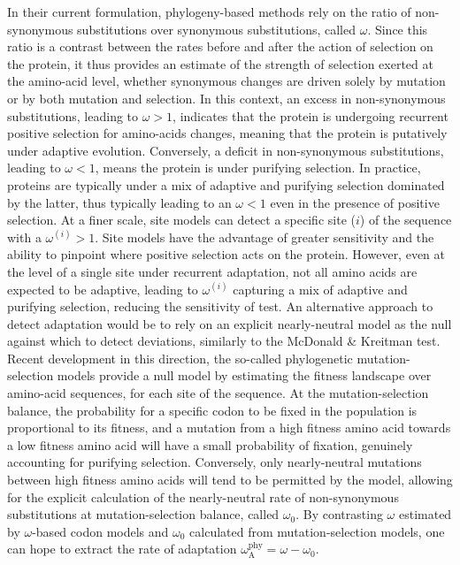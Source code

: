 \documentclass[9pt,twocolumn,twoside,lineno]{pnas-new}
\newcommand{\rateApop}{\omega_{\mathrm{A}}}
\newcommand{\rateAphy}{\rateApop^{\mathrm{phy}}}
\begin{document}
In their current formulation, phylogeny-based methods rely on the ratio of non-synonymous substitutions over synonymous substitutions, called $\omega$\cite{muse_likelihood_1994,goldman_codonbased_1994}.
Since this ratio is a contrast between the rates before and after the action of selection on the protein, it thus provides an estimate of the strength of selection exerted at the amino-acid level, whether synonymous changes are driven solely by mutation or by both mutation and selection\cite{yang_mutationselection_2008}.
In this context, an excess in non-synonymous substitutions, leading to $\omega>1$, indicates that the protein is undergoing recurrent positive selection for amino-acids changes, meaning that the protein is putatively under adaptive evolution.
Conversely, a deficit in non-synonymous substitutions, leading to $\omega<1$, means the protein is under purifying selection.
In practice, proteins are typically under a mix of adaptive and purifying selection dominated by the latter, thus typically leading to an $\omega<1$ even in the presence of positive selection.
At a finer scale, site models can detect a specific site ($i$) of the sequence with a $\omega^{(i)}>1$\cite{yang_codonsubstitution_2000, kosiol_patterns_2008}.
Site models have the advantage of greater sensitivity and the ability to pinpoint where positive selection acts on the protein.
However, even at the level of a single site under recurrent adaptation, not all amino acids are expected to be adaptive, leading to $\omega^{(i)}$ capturing a mix of adaptive and purifying selection, reducing the sensitivity of test.
An alternative approach to detect adaptation would be to rely on an explicit nearly-neutral model as the null against which to detect deviations, similarly to the McDonald \& Kreitman test.
Recent development in this direction, the so-called phylogenetic mutation-selection models provide a null model by estimating the fitness landscape over amino-acid sequences, for each site of the sequence\cite{yang_mutationselection_2008, halpern_evolutionary_1998, rodrigue_mechanistic_2010}.
At the mutation-selection balance, the probability for a specific codon to be fixed in the population is proportional to its fitness, and a mutation from a high fitness amino acid towards a low fitness amino acid will have a small probability of fixation, genuinely accounting for purifying selection.
Conversely, only nearly-neutral mutations between high fitness amino acids will tend to be permitted by the model, allowing for the explicit calculation of the nearly-neutral rate of non-synonymous substitutions at mutation-selection balance, called $\omega_{0}$\cite{spielman_relationship_2015, rodrigue_detecting_2017}.
By contrasting $\omega$ estimated by $\omega$-based codon models and $\omega_{0}$ calculated from mutation-selection models, one can hope to extract the rate of adaptation $\rateAphy = \omega - \omega_{0}$.
\end{document}
